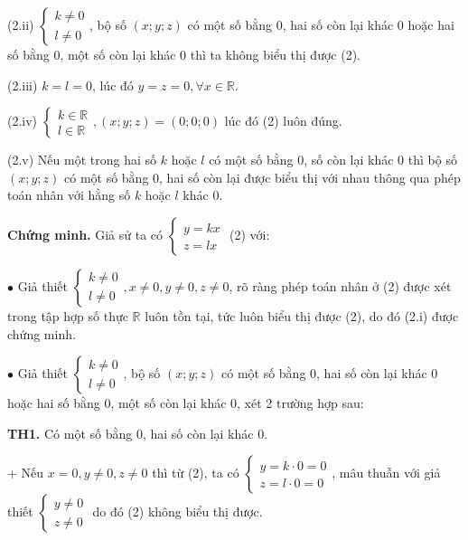 \documentclass[12pt]{report}
\begin{document}
\vspace{0.3cm}
\noindent (2.ii) $\begin{cases} k \neq 0 \\ l \neq 0 \end{cases}$, bộ số $(x; y; z)$ có một số bằng 0, hai số còn lại khác 0 hoặc hai số bằng 0, một số còn lại khác 0 thì ta không biểu thị được (2).

\vspace{0.3cm}
\noindent (2.iii) $k = l = 0$, lúc đó $y = z = 0, \forall x \in \mathbb{R}$.

\vspace{0.3cm}
\noindent (2.iv) $\begin{cases} k \in \mathbb{R} \\ l \in \mathbb{R} \end{cases}, (x; y; z) = (0; 0; 0)$ lúc đó (2) luôn đúng.

\noindent (2.v) Nếu một trong hai số $k$ hoặc $l$ có một số bằng 0, số còn lại khác 0 thì bộ số $(x; y; z)$ có một số bằng 0, hai số còn lại được biểu thị với nhau thông qua phép toán nhân với hằng số $k$ hoặc $l$ khác 0.

\vspace{0.4cm}
\noindent \textbf{Chứng minh.} Giả sử ta có $\begin{cases} y = kx \\ z = lx \end{cases}$ (2) với:

\vspace{0.3cm}
\noindent $\bullet$ Giả thiết $\begin{cases} k \neq 0 \\ l \neq 0 \end{cases}, x \neq 0, y \neq 0, z \neq 0$, rõ ràng phép toán nhân ở (2) được xét trong tập hợp số thực $\mathbb{R}$ luôn tồn tại, tức luôn biểu thị được (2), do đó (2.i) được chứng minh.

\vspace{0.3cm}
\noindent $\bullet$ Giả thiết $\begin{cases} k \neq 0 \\ l \neq 0 \end{cases}$, bộ số $(x; y; z)$ có một số bằng 0, hai số còn lại khác 0 hoặc hai số bằng 0, một số còn lại khác 0, xét 2 trường hợp sau:

\vspace{0.3cm}
\noindent \textbf{TH1.} Có một số bằng 0, hai số còn lại khác 0.

\vspace{0.2cm}
\noindent + Nếu $x = 0, y \neq 0, z \neq 0$ thì từ (2), ta có $\begin{cases} y = k \cdot 0 = 0 \\ z = l \cdot 0 = 0 \end{cases}$, mâu thuẫn với giả thiết $\begin{cases} y \neq 0 \\ z \neq 0 \end{cases}$ do đó (2) không biểu thị được.
\end{document}

